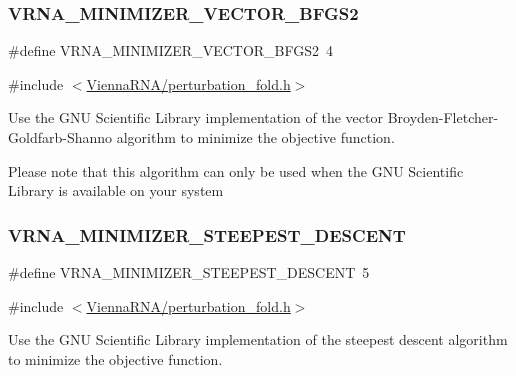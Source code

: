 \subsubsection{\texorpdfstring{V\+R\+N\+A\+\_\+\+M\+I\+N\+I\+M\+I\+Z\+E\+R\+\_\+\+V\+E\+C\+T\+O\+R\+\_\+\+B\+F\+G\+S2}{VRNA\_MINIMIZER\_VECTOR\_BFGS2}}
{\footnotesize\ttfamily \#define V\+R\+N\+A\+\_\+\+M\+I\+N\+I\+M\+I\+Z\+E\+R\+\_\+\+V\+E\+C\+T\+O\+R\+\_\+\+B\+F\+G\+S2~4}



{\ttfamily \#include $<$\mbox{\hyperlink{perturbation__fold_8h}{Vienna\+R\+N\+A/perturbation\+\_\+fold.\+h}}$>$}



Use the G\+NU Scientific Library implementation of the vector Broyden-\/\+Fletcher-\/\+Goldfarb-\/\+Shanno algorithm to minimize the objective function. 

Please note that this algorithm can only be used when the G\+NU Scientific Library is available on your system \mbox{\label{group__perturbation_ga9ecd2144c2ebed7533233da3986521b0}} 
\subsubsection{\texorpdfstring{V\+R\+N\+A\+\_\+\+M\+I\+N\+I\+M\+I\+Z\+E\+R\+\_\+\+S\+T\+E\+E\+P\+E\+S\+T\+\_\+\+D\+E\+S\+C\+E\+NT}{VRNA\_MINIMIZER\_STEEPEST\_DESCENT}}
{\footnotesize\ttfamily \#define V\+R\+N\+A\+\_\+\+M\+I\+N\+I\+M\+I\+Z\+E\+R\+\_\+\+S\+T\+E\+E\+P\+E\+S\+T\+\_\+\+D\+E\+S\+C\+E\+NT~5}



{\ttfamily \#include $<$\mbox{\hyperlink{perturbation__fold_8h}{Vienna\+R\+N\+A/perturbation\+\_\+fold.\+h}}$>$}



Use the G\+NU Scientific Library implementation of the steepest descent algorithm to minimize the objective function. 

